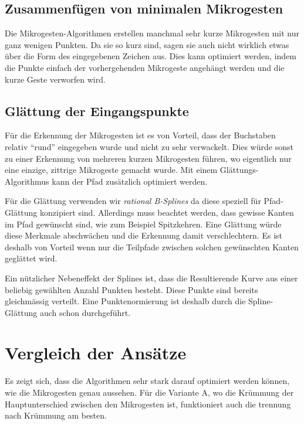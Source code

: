 

\subsection{Zusammenfügen von minimalen Mikrogesten}
Die Mikrogesten-Algorithmen erstellen manchmal sehr kurze Mikrogesten mit nur ganz wenigen Punkten. Da sie so kurz sind, sagen sie auch nicht wirklich etwas über die Form des eingegebenen Zeichen aus. Dies kann optimiert werden, indem die Punkte einfach der vorhergehenden Mikrogeste angehängt werden und die kurze Geste verworfen wird.

\subsection{Glättung der Eingangspunkte}\label{sec:Glaettung}
Für die Erkennung der Mikrogesten ist es von Vorteil, dass der Buchstaben relativ ``rund'' eingegeben wurde und nicht zu sehr verwackelt. Dies würde sonst zu einer Erkennung von mehreren kurzen Mikrogesten führen, wo eigentlich nur eine einzige, zittrige Mikrogeste gemacht wurde. Mit einem Glättungs-Algorithmus kann der Pfad zusätzlich optimiert werden. 

Für die Glättung verwenden wir \emph{rational B-Splines} \cite[S. 454]{smoothing_book} da diese speziell für Pfad-Glättung konzipiert sind. Allerdings muss beachtet werden, dass gewisse Kanten im Pfad gewünscht sind, wie zum Beispiel Spitzkehren. Eine Glättung würde diese Merkmale abschwächen und die Erkennung damit verschlechtern. Es ist deshalb von Vorteil wenn nur die Teilpfade zwischen solchen gewünschten Kanten geglättet wird.

Ein nützlicher Nebeneffekt der Splines ist, dass die Resultierende Kurve aus einer beliebig gewählten Anzahl Punkten besteht. Diese Punkte sind bereits gleichmässig verteilt. Eine Punktenormierung ist deshalb durch die Spline-Glättung auch schon durchgeführt.


\section{Vergleich der Ansätze}
Es zeigt sich, dass die Algorithmen sehr stark darauf optimiert werden können, wie die Mikrogesten genau aussehen. Für die Variante A, wo die Krümmung der Hauptunterschied zwischen den Mikrogesten ist, funktioniert auch die trennung nach Krümmung am besten.

